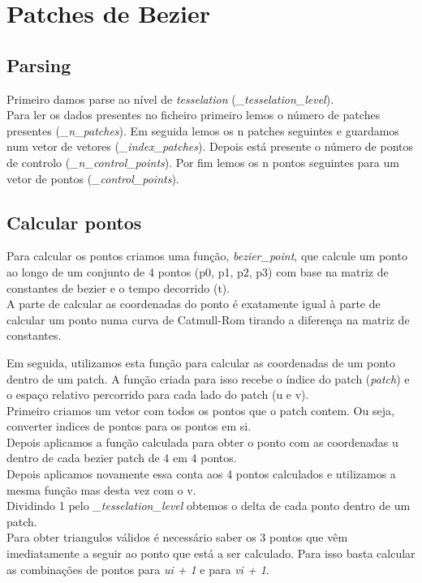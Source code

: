 \documentclass[a4paper]{report}
\begin{document}
\section{Patches de Bezier}
\subsection{Parsing}
Primeiro damos parse ao nível de \textit{tesselation}
(\textit{\_tesselation\_level}).\\
Para ler os dados presentes no ficheiro primeiro lemos o número de patches
presentes (\textit{\_n\_patches}). Em seguida lemos os n patches seguintes e
guardamos num vetor de vetores (\textit{\_index\_patches}). Depois está presente
o número de pontos de controlo (\textit{\_n\_control\_points}). Por fim lemos os
n pontos seguintes para um vetor de pontos (\textit{\_control\_points}).

\subsection{Calcular pontos}
Para calcular os pontos criamos uma função, \textit{bezier\_point}, que calcule
um ponto ao longo de um conjunto de 4 pontos (p0, p1, p2, p3) com base na matriz
de constantes de bezier e o tempo decorrido (t).\\
A parte de calcular as coordenadas do ponto é exatamente igual à parte de
calcular um ponto numa curva de Catmull-Rom tirando a diferença na matriz de
constantes.


Em seguida, utilizamos esta função para calcular as coordenadas de um ponto
dentro de um patch. A função criada para isso recebe o índice do patch
(\textit{patch}) e o espaço relativo percorrido para cada lado do patch (u e
v).\\
Primeiro criamos um vetor com todos os pontos que o patch contem. Ou seja,
converter indices de pontos para os pontos em si.\\
Depois aplicamos a função calculada para obter o ponto com as coordenadas u
dentro de cada bezier patch de 4 em 4 pontos.\\
Depois aplicamos novamente essa conta aos 4 pontos calculados e utilizamos a
mesma função mas desta vez com o v.\\


Dividindo 1 pelo \textit{\_tesselation\_level} obtemos o delta de cada ponto
dentro de um patch.\\
Para obter triangulos válidos é necessário saber os 3 pontos que vêm
imediatamente a seguir ao ponto que está a ser calculado. Para isso basta
calcular as combinações de pontos para \textit{ui + 1} e para \textit{vi + 1}.

\end{document}
